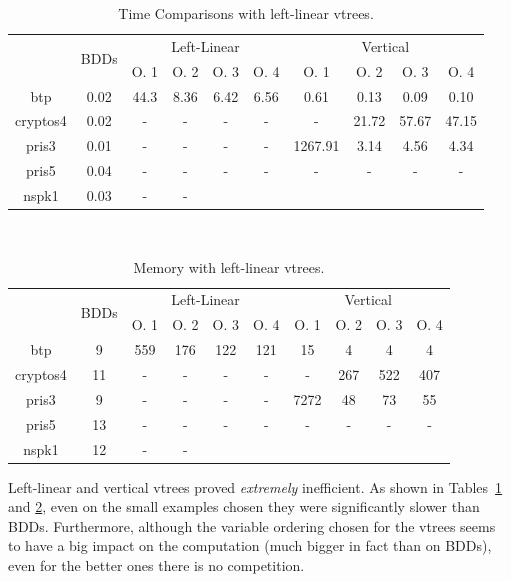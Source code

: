 \documentclass[11pt]{article}
\begin{document}
\begin{table}
\begin{tabular}{|*{10}{c|}}
\hline
\multirow{2}{*}{} & \multirow{2}{*}{BDDs} & \multicolumn{4}{c|}{Left-Linear} & \multicolumn{4}{c|}{Vertical}\\ \cline{3-10}
& & O. 1 & O. 2 & O. 3 & O. 4  & O. 1 & O. 2 & O. 3 & O. 4 \\ \hline
btp & 0.02& 44.3 & 8.36 & 6.42 & 6.56 & 0.61 & 0.13 & 0.09 & 0.10 \\ \hline
cryptos4 & 0.02 & - & - & - & - & - & 21.72 & 57.67 & 47.15 \\ \hline
pris3 & 0.01 & - & - & - & - & 1267.91 & 3.14 & 4.56 & 4.34 \\ \hline
pris5 & 0.04 &- &- &- &- & - &-  &- & -\\ \hline
nspk1 & 0.03 & - & - & & & & & & \\ \hline
\end{tabular}
\caption{Time Comparisons with left-linear vtrees.}
\label{table:otherstandardvtrees1time}
\end{table}
~
\begin{table}
\centering
\begin{tabular}{|*{10}{c|}}
\hline
\multirow{2}{*}{} & \multirow{2}{*}{BDDs} & \multicolumn{4}{c|}{Left-Linear} & \multicolumn{4}{c|}{Vertical}\\ \cline{3-10}
& & O. 1 & O. 2 & O. 3 & O. 4  & O. 1 & O. 2 & O. 3 & O. 4 \\ \hline
btp & 9 & 559 & 176 & 122 & 121 & 15 & 4 & 4 & 4 \\ \hline
cryptos4 & 11 & - & - & -& - & -  & 267 & 522 & 407 \\ \hline
pris3 & 9 & - & - & - & - & 7272 & 48 & 73 & 55 \\ \hline
pris5 & 13 & - &- &- &- &- &- &-&- \\ \hline
nspk1 & 12 & - &- & & & & & & \\ \hline
\end{tabular}
\caption{Memory with left-linear vtrees.}
\label{table:otherstandardvtrees1memory}
\end{table}

Left-linear and vertical vtrees proved \textit{extremely} inefficient. As shown in Tables~\ref{table:otherstandardvtrees1time} and \ref{table:otherstandardvtrees1memory}, even on the small examples chosen they were significantly slower than BDDs. Furthermore, although the variable ordering chosen for the vtrees seems to have a big impact on the computation (much bigger in fact than on BDDs), even for the better ones there is no competition.  
\end{document}
